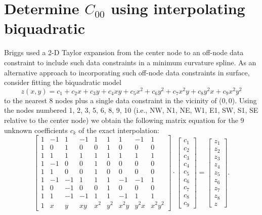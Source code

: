 \documentclass[12pt,letterpaper]{article}
\begin{document}
\section{Determine $C_{00}$ using interpolating biquadratic}
Briggs used a 2-D Taylor expansion from the center node to an off-node data constraint
to include such data constraints in a minimum curvature spline.
As an alternative approach to incorporating such off-node data constraints in surface,
consider fitting the biquadratic model
\begin{equation}
	z(x,y) = c_1 + c_2 x + c_3 y + c_4 xy + c_5 x^2 + c_6 y^2 + c_7 x^2y + c_8 y^2x + c_9 x^2y^2
	\label{eq:biquadratic}
\end{equation}
to the nearest 8 nodes plus a single data constraint in the vicinity of ($0,0$).  Using the nodes numbered 1, 2, 3, 5, 6, 8, 9, 10
(i.e., NW, N1, NE, W1, E1, SW, S1, SE relative to the center node) we obtain the following matrix equation for the 9 unknown coefficients $c_k$ of the exact interpolation:
\begin{equation}
\left[ {\begin{array}{*{20}{c}}
1&{ - 1}&1&{ - 1}&1&1&1&{ - 1}&1\\
1&0&1&0&0&1&0&0&0\\
1&1&1&1&1&1&1&1&1\\
1&{ - 1}&0&0&1&0&0&0&0\\
1&1&0&0&1&0&0&0&0\\
1&{ - 1}&{ - 1}&1&1&1&{ - 1}&{ - 1}&1\\
1&0&{ - 1}&0&0&1&0&0&0\\
1&1&{ - 1}&{ - 1}&1&1&{ - 1}&1&1\\
1&x&y&{xy}&{{x^2}}&{{y^2}}&{{x^2}y}&{{y^2}x}&{{x^2}{y^2}}
\end{array}} \right] \cdot \left[ {\begin{array}{*{20}{c}}
{{c_1}}\\
{{c_2}}\\
{{c_3}}\\
{{c_4}}\\
{{c_5}}\\
{{c_6}}\\
{{c_7}}\\
{{c_8}}\\
{{c_9}}
\end{array}} \right] = \left[ {\begin{array}{*{20}{c}}
{{z_1}}\\
{{z_2}}\\
{{z_3}}\\
{{z_4}}\\
{{z_5}}\\
{{z_6}}\\
{{z_7}}\\
{{z_8}}\\
z
\end{array}} \right].
\end{equation}
\end{document}
